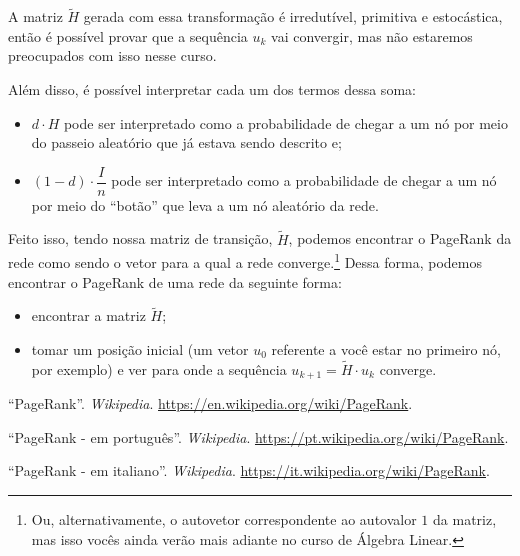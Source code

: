 \documentclass{article}
\begin{document}
A matriz $\tilde{H}$ gerada com essa transformação é irredutível, primitiva e estocástica, então é possível provar que a sequência $u_k$ vai convergir, mas não estaremos preocupados com isso nesse curso.

Além disso, é possível interpretar cada um dos termos dessa soma:
\begin{itemize}
    \item
        $d\cdot H$ pode ser interpretado como a probabilidade de chegar a um nó por meio do passeio aleatório que já estava sendo descrito e;
        
    \item
        $(1 - d)\cdot \dfrac{I}{n}$ pode ser interpretado como a probabilidade de chegar a um nó por meio do ``botão'' que leva a um nó aleatório da rede.
\end{itemize}

Feito isso, tendo nossa matriz de transição, $\tilde{H}$, podemos encontrar o PageRank da rede como sendo o vetor para a qual a rede converge.\footnote{Ou, alternativamente, o autovetor correspondente ao autovalor $1$ da matriz, mas isso vocês ainda verão mais adiante no curso de Álgebra Linear.} Dessa forma, podemos encontrar o PageRank de uma rede da seguinte forma:
\begin{itemize}
    \item
        encontrar a matriz $\tilde{H}$;
        
    \item
        tomar um posição inicial (um vetor $u_0$ referente a você estar no primeiro nó, por exemplo) e ver para onde a sequência $u_{k + 1} = \tilde{H}\cdot u_k$ converge.
\end{itemize}

\begin{thebibliography}{9}

 ``PageRank''. \textit{Wikipedia}. \url{https://en.wikipedia.org/wiki/PageRank}.

 ``PageRank - em português''. \textit{Wikipedia}. \url{https://pt.wikipedia.org/wiki/PageRank}.

 ``PageRank - em italiano''. \textit{Wikipedia}. \url{https://it.wikipedia.org/wiki/PageRank}.

\end{thebibliography}
\end{document}
